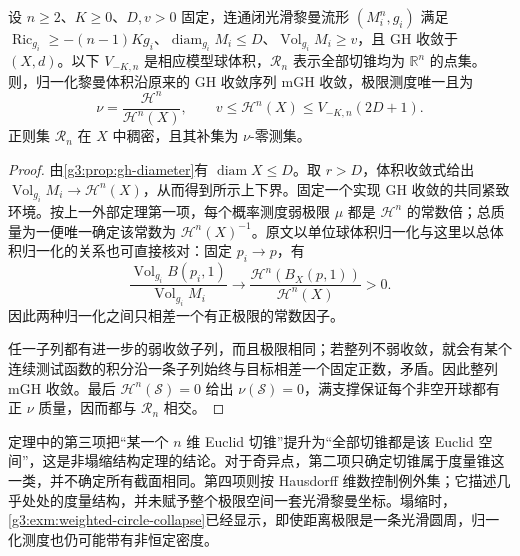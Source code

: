 \begin{corollary}\label{g3:cor:noncollapsed-canonical-measure}
	设 \(n\ge2\)、\(K\ge0\)、\(D,v>0\) 固定，连通闭光滑黎曼流形 \((M_i^n,g_i)\) 满足 \(\operatorname{Ric}_{g_i}\ge-(n-1)Kg_i\)、\(\operatorname{diam}_{g_i}M_i\le D\)、\(\operatorname{Vol}_{g_i}M_i\ge v\)，且 GH 收敛于 \((X,d)\)。以下 \(V_{-K,n}\) 是相应模型球体积，\(\mathcal R_n\) 表示全部切锥均为 \(\mathbb R^n\) 的点集。则，归一化黎曼体积沿原来的 GH 收敛序列 mGH 收敛，极限测度唯一且为
	\begin{equation}\label{g3:eq:noncollapsed-canonical-measure}
		\nu=\frac{\mathcal H^n}{\mathcal H^n(X)},
		\qquad v\le\mathcal H^n(X)\le V_{-K,n}(2D+1).
	\end{equation}
	正则集 \(\mathcal R_n\) 在 \(X\) 中稠密，且其补集为 \(\nu\)-零测集。
\end{corollary}
\begin{proof}
	由\cref{g3:prop:gh-diameter}有 \(\operatorname{diam}X\le D\)。取 \(r>D\)，体积收敛式给出
	\(\operatorname{Vol}_{g_i}M_i\to\mathcal H^n(X)\)，从而得到所示上下界。固定一个实现 GH 收敛的共同紧致环境。按上一外部定理第一项，每个概率测度弱极限 \(\mu\) 都是 \(\mathcal H^n\) 的常数倍；总质量为一便唯一确定该常数为 \(\mathcal H^n(X)^{-1}\)。原文以单位球体积归一化与这里以总体积归一化的关系也可直接核对：固定 \(p_i\to p\)，有
	\[
		\frac{\operatorname{Vol}_{g_i}B(p_i,1)}
		{\operatorname{Vol}_{g_i}M_i}
		\longrightarrow
		\frac{\mathcal H^n(B_X(p,1))}{\mathcal H^n(X)}>0.
	\]
	因此两种归一化之间只相差一个有正极限的常数因子。

	任一子列都有进一步的弱收敛子列，而且极限相同；若整列不弱收敛，就会有某个连续测试函数的积分沿一条子列始终与目标相差一个固定正数，矛盾。因此整列 mGH 收敛。最后 \(\mathcal H^n(\mathcal S)=0\) 给出 \(\nu(\mathcal S)=0\)，满支撑保证每个非空开球都有正 \(\nu\) 质量，因而都与 \(\mathcal R_n\) 相交。
\end{proof}

定理中的第三项把“某一个 \(n\) 维 Euclid 切锥”提升为“全部切锥都是该 Euclid 空间”，这是非塌缩结构定理的结论。对于奇异点，第二项只确定切锥属于度量锥这一类，并不确定所有截面相同。第四项则按 Hausdorff 维数控制例外集；它描述几乎处处的度量结构，并未赋予整个极限空间一套光滑黎曼坐标。塌缩时，\cref{g3:exm:weighted-circle-collapse}已经显示，即使距离极限是一条光滑圆周，归一化测度也仍可能带有非恒定密度。
